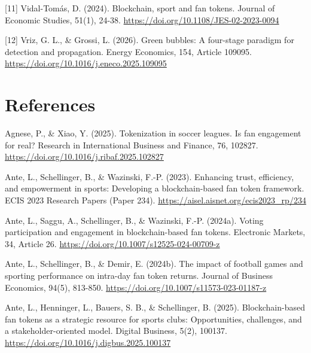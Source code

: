 \documentclass[11pt,a4paper,onecolumn]{article}
\newenvironment{reportreference}{\begingroup\small\setlength{\parskip}{5pt}\leftskip=5mm\parindent=-5mm}{\par\endgroup}
\begin{document}
\begin{reportreference}
[11] Vidal-Tomás, D. (2024). Blockchain, sport and fan tokens. Journal of Economic Studies, 51(1), 24-38. \url{https://doi.org/10.1108/JES-02-2023-0094}
\end{reportreference}

\begin{reportreference}
[12] Vriz, G. L., \& Grossi, L. (2026). Green bubbles: A four-stage paradigm for detection and propagation. Energy Economics, 154, Article 109095. \url{https://doi.org/10.1016/j.eneco.2025.109095}
\end{reportreference}

\clearpage
\section{References}

\begin{reportreference}
Agnese, P., \& Xiao, Y. (2025). Tokenization in soccer leagues. Is fan engagement for real? Research in International Business and Finance, 76, 102827. \url{https://doi.org/10.1016/j.ribaf.2025.102827}
\end{reportreference}

\begin{reportreference}
Ante, L., Schellinger, B., \& Wazinski, F.-P. (2023). Enhancing trust, efficiency, and empowerment in sports: Developing a blockchain-based fan token framework. ECIS 2023 Research Papers (Paper 234). \url{https://aisel.aisnet.org/ecis2023_rp/234}
\end{reportreference}

\begin{reportreference}
Ante, L., Saggu, A., Schellinger, B., \& Wazinski, F.-P. (2024a). Voting participation and engagement in blockchain-based fan tokens. Electronic Markets, 34, Article 26. \url{https://doi.org/10.1007/s12525-024-00709-z}
\end{reportreference}

\begin{reportreference}
Ante, L., Schellinger, B., \& Demir, E. (2024b). The impact of football games and sporting performance on intra-day fan token returns. Journal of Business Economics, 94(5), 813-850. \url{https://doi.org/10.1007/s11573-023-01187-z}
\end{reportreference}

\begin{reportreference}
Ante, L., Henninger, L., Bauers, S. B., \& Schellinger, B. (2025). Blockchain-based fan tokens as a strategic resource for sports clubs: Opportunities, challenges, and a stakeholder-oriented model. Digital Business, 5(2), 100137. \url{https://doi.org/10.1016/j.digbus.2025.100137}
\end{reportreference}
\end{document}
